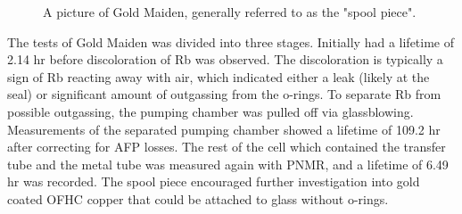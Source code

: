 \begin{figure}[t!]
	\centering
	\caption{{A picture of Gold Maiden, generally referred to as the "spool piece". }}
	\label{spool_piece}
\end{figure}

The tests of Gold Maiden was divided into three stages. Initially had a lifetime of 2.14 hr before discoloration of Rb was observed. The discoloration is typically a sign of Rb reacting away with air, which indicated either a leak (likely at the seal) or significant amount of outgassing from the o-rings. To separate Rb from possible outgassing, the pumping chamber was pulled off via glassblowing. Measurements of the separated pumping chamber showed a lifetime of 109.2 hr after correcting for AFP losses. The rest of the cell which contained the transfer tube and the metal tube was measured again with PNMR, and a lifetime of 6.49 hr was recorded. The spool piece encouraged further investigation into gold coated OFHC copper that could be attached to glass without o-rings.


